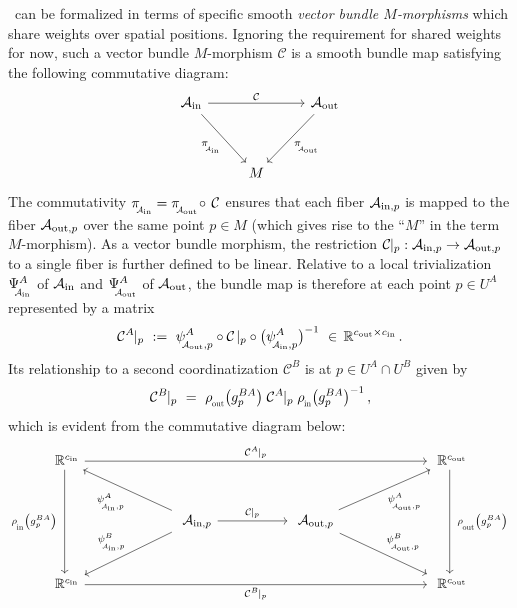 \onexoneGMs\ can be formalized in terms of specific smooth \emph{vector bundle $M$-morphisms} which share weights over spatial positions.
Ignoring the requirement for shared weights for now, such a vector bundle $M$-morphism $\mathcal{C}$ is a smooth bundle map satisfying the following commutative diagram:
\begin{equation}\label{eq:bundle_morphism_onexone}
    \begin{tikzcd}[row sep=3.5em, column sep=2.5em]
        \Ain
            \arrow[rd, "\piAin"']
            \arrow[rr, "\mathcal{C}"]
        & &
        \Aout
            \arrow[ld, "\piAout"]
        \\
        & M
    \end{tikzcd}
\end{equation}
The commutativity $\piAin = \piAout \!\circ\, \mathcal{C}$ ensures that each fiber $\mathcal{A}_{\textup{in},p}$ is mapped to the fiber $\mathcal{A}_{\textup{out},p}$ over the same point $p\in M$ (which gives rise to the ``$M$'' in the term $M$-morphism).
As a vector bundle morphism, the restriction $\mathcal{C}\!\!\;|_p: \mathcal{A}_{\textup{in},p}\to\mathcal{A}_{\textup{out},p}$ to a single fiber is further defined to be linear.
Relative to a local trivialization $\PsiAin^A$ of $\mathcal{A}_\textup{in}$ and $\PsiAout^A$ of $\mathcal{A}_\textup{out}$, the bundle map is therefore at each point $p\in U^A$ represented by a matrix
\begin{align}\label{eq:bundle_morphism_onexone_triv_local}
    \mathcal{C}^A\!\!\;|_p\ :=\  \psiAoutp^A \circ \mathcal{C}\!\;|_p \circ \big(\psiAinp^A\big)^{-1}\ \in\, \R^{\cout\times\cin} \,.
\end{align}
Its relationship to a second coordinatization $\mathcal{C}^B$ is at $p\in U^A\cap U^B$ given by
\begin{align}\label{eq:onexone_gaugetrafo}
    \mathcal{C}^B\!\!\;|_p \ =\ \rhoout\big(g_p^{BA}\big)\; \mathcal{C}^A\!\!\;|_p\; \rhoin\big(g_p^{BA}\big)^{-1} \,,
\end{align}
which is evident from the commutative diagram below:
\begin{equation}
\begin{tikzcd}[column sep=65pt, row sep=30, font=\normalsize]
    \R^{\cin}
        \arrow[dd, "\rhoin\big(g_p^{BA}\big)\ "']
        \arrow[rrr, "\mathcal{C}^A\!\!\;|_p"]
    & &[-3ex] &
    \R^{\cout}
        \arrow[dd, "\ \rhoout\big(g_p^{BA}\big)"]
    \\
    &
    \Ainp
        \arrow[r, "\mathcal{C}\!\!\;|_p"]
        \arrow[ul, "\psiAinp^A"]
        \arrow[dl, "\psiAinp^B"']
    &
    \Aoutp
        \arrow[ur, "\psiAoutp^A"']
        \arrow[dr, "\psiAoutp^B"]
    \\
    \R^{\cin}
        \arrow[rrr, "\mathcal{C}^B\!\!\;|_p"']
    & & &
    \R^{\cout}
\end{tikzcd}
\end{equation}


